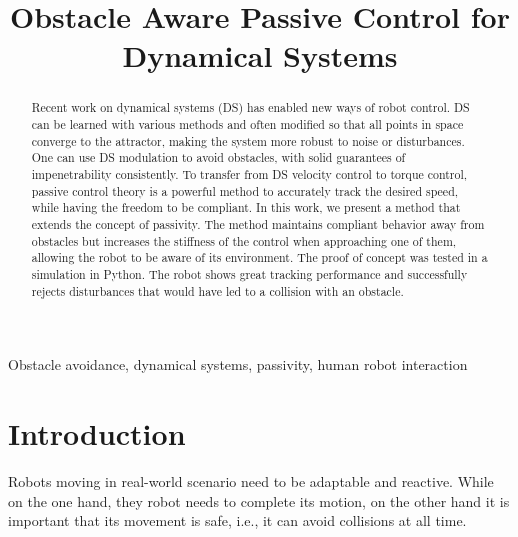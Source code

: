 \documentclass[conference]{IEEEtran}
\begin{document}
\newcommand{\vect}[1]{\boldsymbol{#1}}
\newcommand{\vecs}[1]{\boldsymbol{#1}}
\newcommand{\matr}[1]{\boldsymbol{#1}}
\newcommand{\matd}[1]{\mathcal{#1}}

\newcommand{\dotprod}[2]{\left\langle {#1}, \, {#2} \right\rangle}
\newcommand{\normdotprod}[2]{\frac{\left\langle #1, \, #2 \right\rangle}{\| #1 \| \, \| #2 \|}}

\newtheorem{theorem}{Theorem}[section]
\newtheorem{corollary}{Corollary}[theorem]
\newtheorem{lemma}{Lemma}[theorem]
\theoremstyle{definition}
\newtheorem{definition}{Definition}[section]


\title{Obstacle Aware Passive Control for Dynamical Systems}
\author{
}

\maketitle
\thispagestyle{plain}
\pagestyle{plain}

\begin{abstract}
Recent work on dynamical systems (DS) has enabled new ways of robot control. DS can be learned with various methods and often modified so that all points in space converge to the attractor, making the system more robust to noise or disturbances.
One can use DS modulation to avoid obstacles, with solid guarantees of impenetrability consistently. To transfer from DS velocity control to torque control, passive control theory is a powerful method to accurately track the desired speed, while having the freedom to be compliant.
In this work, we present a method that extends the concept of passivity.
The method maintains compliant behavior away from obstacles but increases the stiffness of the control when approaching one of them, allowing the robot to be aware of its environment.
The proof of concept was tested in a simulation in Python. The robot shows great tracking performance and successfully rejects disturbances that would have led to a collision with an obstacle. 
\end{abstract}

\begin{IEEEkeywords}
Obstacle avoidance, dynamical systems, passivity, human robot interaction
\end{IEEEkeywords}


\section{Introduction}
Robots moving in real-world scenario need to be adaptable and reactive.
While on the one hand, they robot needs to complete its motion, on the other hand it is important that its movement is safe, i.e., it can avoid collisions at all time.
\end{document}
